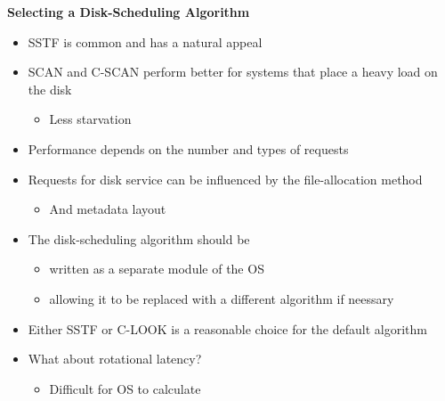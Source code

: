 \documentclass[11pt,a4paper]{article}
\begin{document}
\textbf{Selecting a Disk-Scheduling Algorithm}
\begin{itemize}
    \item SSTF is common and has a natural appeal
    \item SCAN and C-SCAN perform better for systems that place a heavy load on the disk
        \begin{itemize}
            \item  Less starvation
        \end{itemize}
    \item Performance depends on the number and types of requests
    \item Requests for disk service can be influenced by the file-allocation method
        \begin{itemize}
            \item And metadata layout
        \end{itemize}
    \item The disk-scheduling algorithm should be
        \begin{itemize}
            \item written as a separate module of the OS
            \item allowing it to be replaced with a different algorithm if neessary
        \end{itemize}
    \item Either SSTF or C-LOOK is a reasonable choice for the default algorithm
    \item What about rotational latency?
        \begin{itemize}
            \item Difficult for OS to calculate
        \end{itemize}
\end{itemize}
\end{document}
